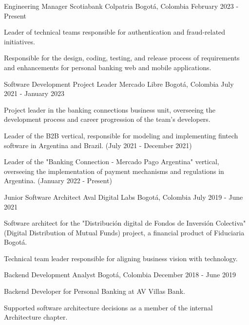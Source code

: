 \begin{cventries}
    \cventry
    {Engineering Manager}
    {Scotiabank Colpatria}
    {Bogotá, Colombia}
    {February 2023 - Present}
    {
        \begin{cvitems}
            \item {Leader of technical teams responsible for authentication and fraud-related initiatives.}
            \item {Responsible for the design, coding, testing, and release process of requirements and enhancements for personal banking web and mobile applications.}
        \end{cvitems}
    }

    \cventry
    {Software Development Project Leader}
    {Mercado Libre}
    {Bogotá, Colombia}
    {July 2021 - January 2023}
    {
        \begin{cvitems}
            \item {Project leader in the banking connections business unit, overseeing the development process and career progression of the team's developers.}
            \item {Leader of the B2B vertical, responsible for modeling and implementing fintech software in Argentina and Brazil. (July 2021 - December 2021)}
            \item {Leader of the "Banking Connection - Mercado Pago Argentina" vertical, overseeing the implementation of payment mechanisms and regulations in Argentina. (January 2022 - Present)}
        \end{cvitems}
    }

    \cventry
    {Junior Software Architect}
    {Aval Digital Labs}
    {Bogotá, Colombia}
    {July 2019 - June 2021}
    {
        \begin{cvitems}
            \item {Software architect for the "Distribución digital de Fondos de Inversión Colectiva" (Digital Distribution of Mutual Funds) project, a financial product of Fiduciaria Bogotá.}
            \item {Technical team leader responsible for aligning business vision with technology.}
        \end{cvitems}
    }

    \cventry
    {Backend Development Analyst}
    {}
    {Bogotá, Colombia}
    {December 2018 - June 2019}
    {
        \begin{cvitems}
            \item {Backend Developer for Personal Banking at AV Villas Bank.}
            \item {Supported software architecture decisions as a member of the internal Architecture chapter.}
        \end{cvitems}
    }


\end{cventries}
